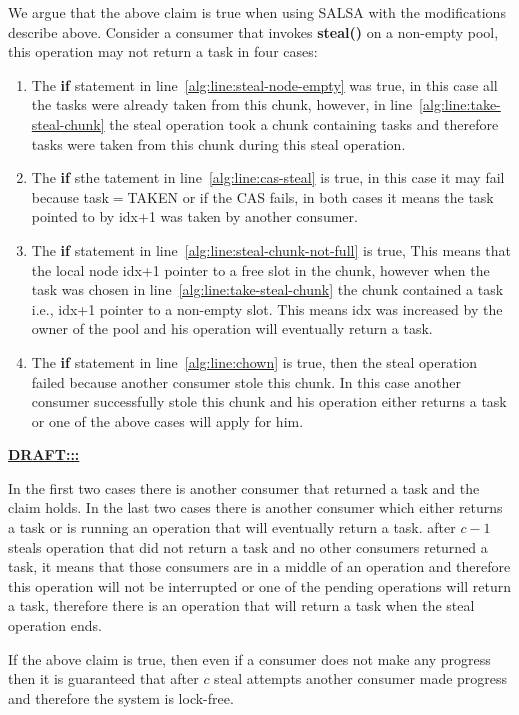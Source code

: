 We argue that the above claim is true when using SALSA with the modifications describe above. Consider a consumer that invokes {\bf steal()} on a non-empty pool, this operation may not return a task in four cases:
\begin{enumerate}
 \item The {\bf if} statement in line~\ref{alg:line:steal-node-empty} was true, in this case all the tasks were already taken from this chunk, however, in line~\ref{alg:line:take-steal-chunk} the steal operation took a chunk containing tasks and therefore tasks were taken from this chunk during this steal operation.
 \item The {\bf if} sthe tatement in line~\ref{alg:line:cas-steal} is true, in this case it may fail because task$=$TAKEN or if the CAS fails, in both cases it means the task pointed to by idx+1 was taken by another consumer.
 \item The {\bf if} statement in line~\ref{alg:line:steal-chunk-not-full} is true, This means that the local node idx+1 pointer to a free slot in the chunk, however when the task was chosen in line~\ref{alg:line:take-steal-chunk} the chunk contained a task i.e., idx+1 pointer to a non-empty slot. This means idx was increased by the owner of the pool and his operation will eventually return a task.
 \item The {\bf if} statement in line~\ref{alg:line:chown} is true, then the steal operation failed because another consumer stole this  chunk. In this case another consumer successfully stole this chunk and his operation either returns a task or one of the above cases will apply for him. 
\end{enumerate}

\underline{\bf DRAFT:::}

In the first two cases there is another consumer that returned a task and the claim holds. In the last two cases there is another consumer which either returns a task or is running an operation that will eventually return a task. after $c-1$ steals operation that did not return a task and no other consumers returned a task, it means that those consumers are in a middle of an operation and therefore this operation will not be interrupted or one of the pending operations will return a task, therefore there is an operation that will return a task when the steal operation ends.  

If the above claim is true, then even if a consumer does not make any progress then it is guaranteed that after $c$ steal attempts another consumer made progress and therefore the system is lock-free.